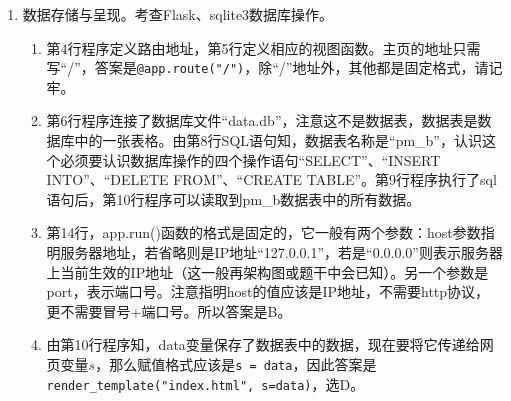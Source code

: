 \begin{enumerate}
\begin{enumerate}[label=$(\arabic*)$]
\begin{lstlisting}[numbers=left]
    app.run(`\clozeblank{2}`)
\end{lstlisting}
	\item 数据存储与呈现。考查Flask、sqlite3数据库操作。
		\begin{enumerate}[label=$(\alph*)$]
		\item 第4行程序定义路由地址，第5行定义相应的视图函数。主页的地址只需写“/”，答案是\lstinline|@app.route("/")|，除“/”地址外，其他都是固定格式，请记牢。
		\item 第6行程序连接了数据库文件“data.db”，注意这不是数据表，数据表是数据库中的一张表格。由第8行SQL语句知，数据表名称是“pm\_b”，认识这个必须要认识数据库操作的四个操作语句“SELECT”、“INSERT INTO”、“DELETE FROM”、“CREATE TABLE”。第9行程序执行了sql语句后，第10行程序可以读取到pm\_b数据表中的所有数据。
		\item 第14行，app.run()函数的格式是固定的，它一般有两个参数：host参数指明服务器地址，若省略则是IP地址“127.0.0.1”，若是“0.0.0.0”则表示服务器上当前生效的IP地址（这一般再架构图或题干中会已知）。另一个参数是port，表示端口号。注意指明host的值应该是IP地址，不需要http协议，更不需要冒号+端口号。所以答案是B。
		\item 由第10行程序知，data变量保存了数据表中的数据，现在要将它传递给网页变量$s$，那么赋值格式应该是\lstinline|s = data|，因此答案是\lstinline|render_template("index.html", s=data)|，选D。
		\end{enumerate}	
	\end{enumerate}


\end{enumerate}


\newpage
